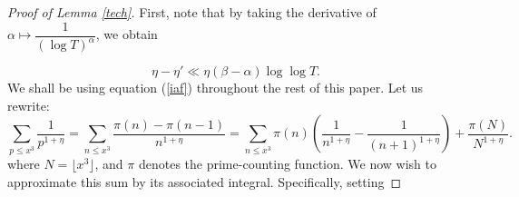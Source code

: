 \documentclass{article}
\newcommand{\1}{\mathds{1}}
\numberwithin{equation}{section}
\renewcommand{\leq}{\leqslant}
\theoremstyle{plain} %
\begin{document}
\begin{proof}[Proof of Lemma \ref{tech}]
First, note that by taking the derivative of $\alpha \mapsto \dfrac{1}{(\log T)^\alpha}$, we obtain

\begin{equation}
    \label{iaf}
    \eta - \eta' \ll \eta (\beta - \alpha) \log \log T.
\end{equation}
We shall be using equation (\ref{iaf}) throughout the rest of this paper.
Let us rewrite:
\begin{equation}
        \sum_{p \leq x^3} \frac{1}{p^{1 + \eta}}  = \sum_{n \leq x^3} \frac{\pi(n) - \pi(n-1)}{n^{1+\eta}} 
 = \sum_{n \leq x^3} \pi(n) (\frac{1}{n^{1 + \eta}} - \frac{1}{(n+1)^{1 + \eta}}) + \frac{\pi(N)}{N^{1+\eta}}.
\end{equation}
where $N = \lfloor x^3 \rfloor$, and $\pi$ denotes the prime-counting function. We now wish to approximate this sum by its associated integral. Specifically, setting


\end{proof}
\end{document}
